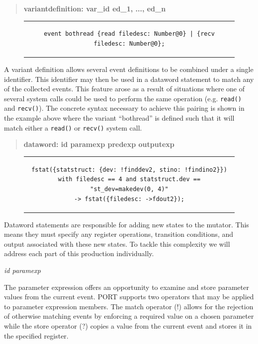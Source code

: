 \begin{quote}
\centering
\textbf{variantdefinition: var\_id ed\_1, ..., ed\_n}
\end{quote}

\begin{figure}[H]
\centering
\begin{tabular}{c}
\begin{lstlisting}
event bothread {read filedesc: Number@0} | {recv filedesc: Number@0};
\end{lstlisting}
\end{tabular}
\end{figure}

A variant definition allows several event definitions to be combined under
a single identifier.  This identifier may then be used in a dataword
statement to match any of the collected events.  This feature arose as a
result of situations where one of several system calls could be used to
perform the same operation (e.g. {\tt read()} and {\tt recv()}).  The
concrete syntax necessary to achieve this pairing is shown in the example
above where the variant ``bothread'' is defined such that it will match
either a {\tt read()} or {\tt recv()} system call.

\begin{quote}
\centering
\textbf{dataword: id paramexp predexp outputexp}
\end{quote}

\begin{figure}[H]
\centering
\begin{tabular}{c}
\begin{lstlisting}
fstat({statstruct: {dev: !finddev2, stino: !findino2}})
with filedesc == 4 and statstruct.dev == "st_dev=makedev(0, 4)"
-> fstat({filedesc: ->fdout2});
\end{lstlisting}
\end{tabular}
\end{figure}

Dataword statements are responsible for adding new states to the
mutator.  This means they must specify any register operations,
transition conditions, and output associated with these new states.  To
tackle this complexity we will address each part of this production
individually.

\textit{id paramexp}

The parameter expression offers an opportunity to examine and store
parameter values from the current event.  PORT supports two operators
that may be applied to parameter expression members.  The match operator
(!) allows for the rejection of otherwise matching events
by enforcing a required value on a
chosen parameter while the store operator (?) copies a value from the
current event and stores it in the specified register.


